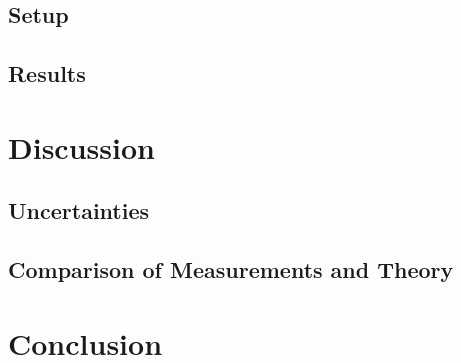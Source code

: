 \section{Setup}
\section{Results}

\chapter{Discussion}
\section{Uncertainties}
\section{Comparison of Measurements and Theory}

\chapter{Conclusion}




